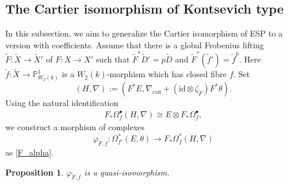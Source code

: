 \documentclass[12pt, a4paper]{article}
\newtheorem{proposition}{Proposition}[section]
\begin{document}
\subsection{The Cartier isomorphism of Kontsevich type}
In this subsection, we aim to generalize the Cartier isomorphism of ESP to a version with coefficients. Assume that there is a global Frobenius lifting $\tilde F:\tilde X\to\tilde X'$ of $F:X\to X'$ such that $\tilde F^*\tilde D'=p\tilde D$ and $\tilde F^*(\tilde f')=\tilde f^p$. Here $\tilde f:\tilde X\to\mathbb P^1_{W_2(k)}$ is a $W_2(k)$-morphism which has closed fibre $f$. Set
$$
(H,\nabla):=(F^*E,\nabla_\mathrm{can}+(\mathrm{id}\otimes\zeta_{\tilde F})F^*\theta).
$$
Using the natural identification
\begin{eqnarray}\label{identification f}
F_*\Omega^\bullet_f(H,\nabla)\cong E\otimes F_*\Omega^\bullet_f,
\end{eqnarray}
we construct a morphism of complexes
$$
\varphi_{\tilde F,f}:\Omega_{f'}^*(E,\theta)\to F_*\Omega^*_f(H,\nabla)
$$
as \eqref{F_alpha}.
\begin{proposition}\label{Cartier f}
$\varphi_{\tilde F,f}$ is a quasi-isomorphism.
\end{proposition}
\end{document}
